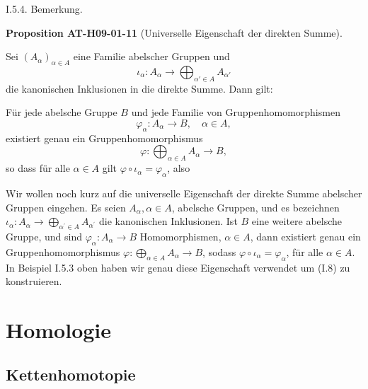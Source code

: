 \documentclass[10pt, letterpaper]{article}
\newcommand{\CustomHeading}[3]{%
  \par\medskip\noindent%
  \textbf{#1 #2} \textnormal{(#3)}.\enskip%
}
\newenvironment{PROP}[2]{\begin{unitbox}\CustomHeading{Proposition}{#1}{#2}}{\end{unitbox}}
\begin{document}
I.5.4. Bemerkung. 



\begin{PROP}{AT-H09-01-11}{Universelle Eigenschaft der direkten Summe}
Sei $(A_\alpha)_{\alpha \in A}$ eine Familie abelscher Gruppen und
\[
\iota_\alpha : A_\alpha \rightarrow \bigoplus_{\alpha' \in A} A_{\alpha'}
\]
die kanonischen Inklusionen in die direkte Summe. Dann gilt:

Für jede abelsche Gruppe $B$ und jede Familie von Gruppenhomomorphismen
\[
\varphi_\alpha : A_\alpha \rightarrow B, \quad \alpha \in A,
\]
existiert genau ein Gruppenhomomorphismus
\[
\varphi : \bigoplus_{\alpha \in A} A_\alpha \rightarrow B,
\]
so dass für alle $\alpha \in A$ gilt $\varphi \circ \iota_\alpha = \varphi_\alpha$, also
\begin{center}
\end{center}
\end{PROP}


Wir wollen noch kurz auf die universelle Eigenschaft der direkte Summe abelscher Gruppen eingehen. Es seien $A_\alpha, \alpha \in A$, abelsche Gruppen, und es bezeichnen $\iota_\alpha: A_\alpha \rightarrow \bigoplus_{\alpha^{\prime} \in A} A_{\alpha^{\prime}}$ die kanonischen Inklusionen. Ist $B$ eine weitere abelsche Gruppe, und sind $\varphi_\alpha: A_\alpha \rightarrow B$ Homomorphismen, $\alpha \in A$, dann existiert genau ein Gruppenhomomorphismus $\varphi: \bigoplus_{\alpha \in A} A_\alpha \rightarrow B$, sodass $\varphi \circ \iota_\alpha=\varphi_\alpha$, für alle $\alpha \in A$. In Beispiel I.5.3 oben haben wir genau diese Eigenschaft verwendet um (I.8) zu konstruieren.




\pagebreak

\section{Homologie}





\subsection{Kettenhomotopie}
\end{document}
